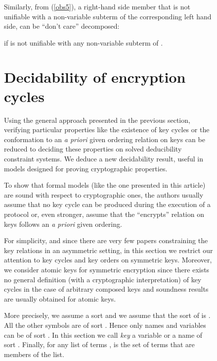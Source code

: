 \documentclass[acmtocl,acmnow]{acmtrans2m}
\newcommand{\dedsyss}[1]{deducibility constraint systems}
\begin{document}
\begin{figure}[t]
{{Similarly, from (\ref{obs5}), a right-hand side member
that is not unifiable with a non-variable subterm of the corresponding
left hand side, can be ``don't care'' decomposed:

if  is not unifiable with any non-variable subterm of .
































\section{Decidability of encryption cycles}\label{sec:cycles}
Using the general approach presented in the
previous section, verifying particular properties like the existence
of key cycles or the conformation to an \emph{a priori} given ordering
relation on keys can be reduced to deciding these properties on solved
\dedsyss{}. We deduce a new decidability result, useful in
models designed for proving cryptographic properties. 

To show that formal models (like the one presented in this article)
are sound with respect to cryptographic ones, the authors usually
assume that no key cycle can be produced during the execution of a
protocol or, even stronger, assume that the ``encrypts'' relation on keys
follows an \emph{a priori} given ordering.

For simplicity, and since there are very few papers constraining the key
relations in an asymmetric setting, in this section we restrict our attention to key cycles and key orders
on symmetric keys. Moreover, we consider atomic keys for symmetric encryption since
there exists no general definition (with a cryptographic interpretation) of key cycles in the case of arbitrary composed keys and soundness results are usually obtained for atomic keys.



More precisely, we assume a sort
 and we assume that the sort of  is
. All the other symbols are
of sort . Hence only names and variables can be of
sort . In this section we call \emph{key} a variable or a name of sort . Finally, for any list of terms ,  is the set of terms
that are members of the list.


















}}
\end{figure}
\end{document}

